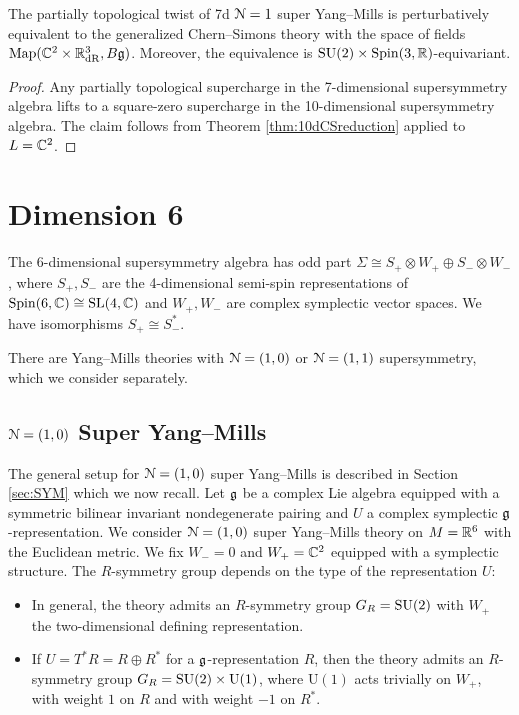 \documentclass[10pt, oneside]{article}
\renewcommand{\U}{\mathrm{U}}
\begin{document}
\begin{thm}
The partially topological twist of 7d $\mathcal N=1$ super Yang--Mills is perturbatively equivalent to the generalized Chern--Simons theory with the space of fields $\operatorname{Map}(\mathbb C^2\times \mathbb R^3_{\mathrm{dR}}, B\mathfrak g)$. Moreover, the equivalence is $\mathrm{SU}(2)\times \mathrm{Spin}(3, \mathbb R)$-equivariant.
\label{thm:7dpartiallytopologicaltwist}
\end{thm}
\begin{proof}
Any partially topological supercharge in the 7-dimensional supersymmetry algebra lifts to a square-zero supercharge in the 10-dimensional supersymmetry algebra. The claim follows from Theorem \ref{thm:10dCSreduction} applied to $L=\mathbb C^2$.
\end{proof}

\section{Dimension 6}

The 6-dimensional supersymmetry algebra has odd part $\Sigma\cong S_+\otimes W_+\oplus S_-\otimes W_-$, where $S_+, S_-$ are the 4-dimensional semi-spin representations of $\mathrm{Spin}(6, \mathbb C)\cong \mathrm{SL}(4, \mathbb C)$ and $W_+, W_-$ are complex symplectic vector spaces. We have isomorphisms $S_+\cong S_-^*$.

There are Yang--Mills theories with $\mathcal N=(1, 0)$ or $\mathcal N=(1, 1)$ supersymmetry, which we consider separately.

\subsection{\texorpdfstring{$\mathcal N=(1, 0)$}{N=(1, 0)} Super Yang--Mills}

The general setup for $\mathcal N=(1, 0)$ super Yang--Mills is described in Section \ref{sec:SYM} which we now recall. Let $\mathfrak g$ be a complex Lie algebra equipped with a symmetric bilinear invariant nondegenerate pairing and $U$ a complex symplectic $\mathfrak g$-representation. We consider $\mathcal N=(1, 0)$ super Yang--Mills theory on $M=\mathbb R^6$ with the Euclidean metric. We fix $W_- = 0$ and $W_+=\mathbb C^2$ equipped with a symplectic structure. The $R$-symmetry group depends on the type of the representation $U$:
\begin{itemize}
\item In general, the theory admits an $R$-symmetry group $G_R=\mathrm{SU}(2)$ with $W_+$ the two-dimensional defining representation.

\item If $U = T^* R=R\oplus R^*$ for a $\mathfrak g$-representation $R$, then the theory admits an $R$-symmetry group $G_R=\SU(2)\times \U(1)$, where $\U(1)$ acts trivially on $W_+$, with weight $1$ on $R$ and with weight $-1$ on $R^*$.
\end{itemize}
\end{document}

